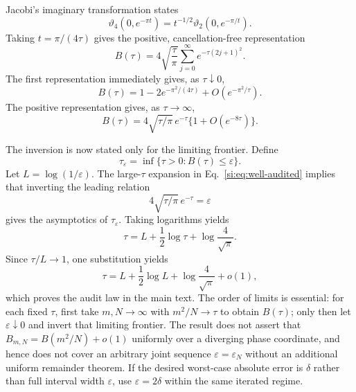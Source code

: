 \documentclass[10pt,twocolumn]{article}
\begin{document}
Jacobi's imaginary transformation states
\begin{equation}
\vartheta_4(0,e^{-\pi t})
=t^{-1/2}\vartheta_2(0,e^{-\pi/t}).
\label{si:eq:modular}
\end{equation}
Taking $t=\pi/(4\tau)$ gives the positive, cancellation-free representation
\begin{equation}
B(\tau)=4\sqrt{\frac{\tau}{\pi}}
\sum_{j=0}^\infty e^{-\tau(2j+1)^2}.
\label{si:eq:positive-theta}
\end{equation}
The first representation immediately gives, as $\tau\downarrow0$,
\begin{equation}
B(\tau)=1-2e^{-\pi^2/(4\tau)}+O(e^{-\pi^2/\tau}).
\label{si:eq:under-audited}
\end{equation}
The positive representation gives, as $\tau\to\infty$,
\begin{equation}
B(\tau)=4\sqrt{\tau/\pi}\,e^{-\tau}
\{1+O(e^{-8\tau})\}.
\label{si:eq:well-audited}
\end{equation}

The inversion is now stated only for the limiting frontier. Define
\begin{equation}
\tau_\varepsilon=\inf\{\tau>0:B(\tau)\le\varepsilon\}.
\label{si:eq:tau-epsilon-definition}
\end{equation}
Let $L=\log(1/\varepsilon)$. The large-$\tau$ expansion in
Eq.~\ref{si:eq:well-audited} implies that inverting the leading relation
\begin{equation}
4\sqrt{\tau/\pi}\,e^{-\tau}=\varepsilon
\label{si:eq:invert-leading}
\end{equation}
gives the asymptotics of $\tau_\varepsilon$. Taking logarithms yields
\begin{equation}
\tau=L+\frac12\log\tau+\log\frac4{\sqrt\pi}.
\label{si:eq:implicit-tau}
\end{equation}
Since $\tau/L\to1$, one substitution yields
\begin{equation}
\tau=L+\frac12\log L+\log\frac4{\sqrt\pi}+o(1),
\label{si:eq:audit-law}
\end{equation}
which proves the audit law in the main text. The order of limits is essential:
for each fixed $\tau$, first take $m,N\to\infty$ with $m^2/N\to\tau$ to obtain
$B(\tau)$; only then let $\varepsilon\downarrow0$ and invert that limiting
frontier. The result does not assert that
$B_{m,N}=B(m^2/N)+o(1)$ uniformly over a diverging phase coordinate, and hence
does not cover an arbitrary joint sequence $\varepsilon=\varepsilon_N$ without
an additional uniform remainder theorem. If the desired worst-case absolute
error is $\delta$ rather than full interval width $\varepsilon$, use
$\varepsilon=2\delta$ within the same iterated regime.
\end{document}
